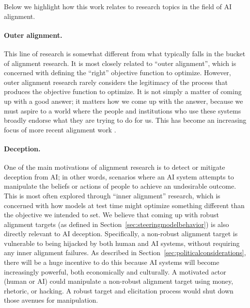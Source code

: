 \documentclass{article}
\theoremstyle{definition}
\begin{document}
Below we highlight how this work relates to research topics in the field of AI alignment.

\paragraph{Outer alignment.} This line of research is somewhat different from what typically falls in the bucket of alignment research. It is most closely related to “outer alignment”, which is concerned with defining the “right” objective function to optimize. However, outer alignment research rarely considers the legitimacy of the process that produces the objective function to optimize. It is not simply a matter of coming up with a good answer; it matters how we come up with the answer, because we must aspire to a world where the people and institutions who use these systems broadly endorse what they are trying to do for us. This has become an increasing focus of more recent alignment work \citep{ji2024ai}.

\paragraph{Deception.} One of the main motivations of alignment research is to detect or mitigate deception from AI; in other words, scenarios where an AI system attempts to manipulate the beliefs or actions of people to achieve an undesirable outcome. This is most often explored through “inner alignment” research, which is concerned with how models at test time might optimize something different than the objective we intended to set. We believe that coming up with robust alignment targets (as defined in Section~\ref{sec:steeringmodelbehavior}) is also directly relevant to AI deception. Specifically, a non-robust alignment target is vulnerable to being hijacked by both human and AI systems, without requiring any inner alignment failures. As described in Section~\ref{sec:politicalconsiderations}, there will be a huge incentive to do this because AI systems will become increasingly powerful, both economically and culturally. A motivated actor (human or AI) could manipulate a non-robust alignment target using money, rhetoric, or hacking. A robust target and elicitation process would shut down those avenues for manipulation.
\end{document}
